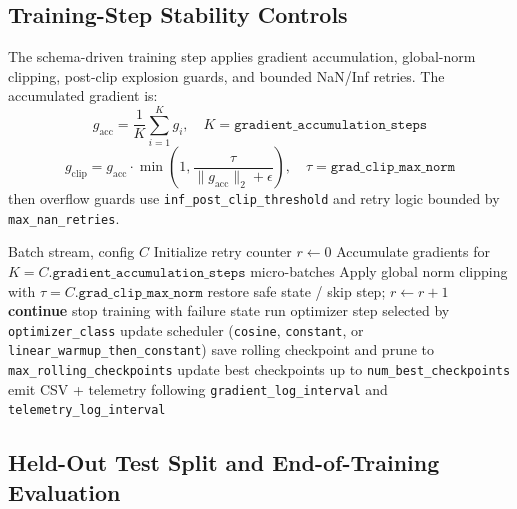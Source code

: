 \subsection{Training-Step Stability Controls}

The schema-driven training step applies gradient accumulation, global-norm clipping, post-clip explosion guards, and bounded NaN/Inf retries. The accumulated gradient is:
\[
g_{\text{acc}}=\frac{1}{K}\sum_{i=1}^{K} g_i,\quad K=\texttt{gradient\_accumulation\_steps}
\]
\[
g_{\text{clip}} = g_{\text{acc}}\cdot
\min\left(1,\frac{\tau}{\|g_{\text{acc}}\|_2+\epsilon}\right),\quad
\tau=\texttt{grad\_clip\_max\_norm}
\]
then overflow guards use \texttt{inf\_post\_clip\_threshold} and retry logic bounded by \texttt{max\_nan\_retries}.

\begin{algorithm}[t]
\caption{Schema-Driven Training Step with Stability Controls}
\begin{algorithmic}[1]
\Require Batch stream, config $C$
\State Initialize retry counter $r\gets 0$
    \State Accumulate gradients for $K=C.\texttt{gradient\_accumulation\_steps}$ micro-batches
    \State Apply global norm clipping with $\tau=C.\texttt{grad\_clip\_max\_norm}$
            \State restore safe state / skip step; $r \gets r+1$
            \State \textbf{continue}
        \Else
            \State stop training with failure state
        \EndIf
    \EndIf
    \State run optimizer step selected by \texttt{optimizer\_class}
    \State update scheduler (\texttt{cosine}, \texttt{constant}, or \texttt{linear\_warmup\_then\_constant})
        \State save rolling checkpoint and prune to \texttt{max\_rolling\_checkpoints}
    \EndIf
    \State update best checkpoints up to \texttt{num\_best\_checkpoints}
    \State emit CSV + telemetry following \texttt{gradient\_log\_interval} and \texttt{telemetry\_log\_interval}
\EndFor
\end{algorithmic}
\end{algorithm}

\subsection{Held-Out Test Split and End-of-Training Evaluation}

